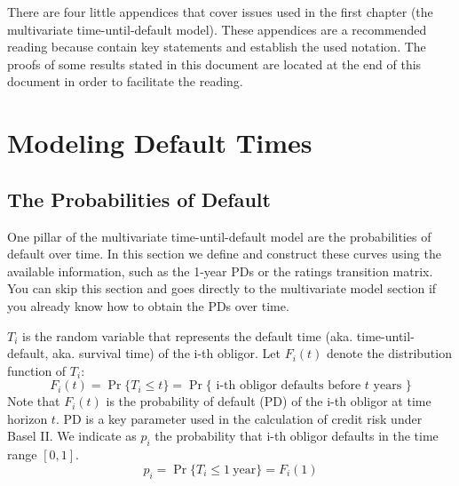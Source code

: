 \documentclass[11pt,fleqn]{book} %
\begin{document}
There are four little appendices that cover issues used in the first chapter 
(the multivariate time-until-default model). These appendices are a recommended 
reading because contain key statements and establish the used notation.
The proofs of some results stated in this document are located at the end of 
this document in order to facilitate the reading.



\chapter{Modeling Default Times}
\label{chap:mdt}

\section{The Probabilities of Default}
\label{sec:pd}

One pillar of the multivariate time-until-default model are the probabilities 
of default over time. In this section we define and construct these curves 
using the available information, such as the 1-year PDs or the ratings 
transition matrix. You can skip this section and goes directly to the 
multivariate model section if you already know how to obtain the PDs over 
time.

\begin{definition}
	$T_i$ is the random variable that represents the default time (aka. 
	time-until-default, aka. survival time) of the i-th obligor. Let $F_i(t)$
	denote the distribution function of $T_i$:
	\begin{displaymath}
		F_i(t) = \Pr\{T_i \le t\} = 
		\Pr\{\text{ i-th obligor defaults before $t$ years }\}
	\end{displaymath}
	Note that $F_i(t)$ is the probability of default (PD) of the i-th obligor
	at time horizon $t$. PD is a key parameter used in the calculation of credit 
	risk under Basel II. We indicate as $p_i$ the probability that i-th obligor 
	defaults in the time range $[0,1]$.
	\begin{displaymath}
		p_i = \Pr\{T_i \le 1\ \text{year}\} = F_i(1) 
	\end{displaymath}
\end{definition}
\end{document}
